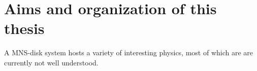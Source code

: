 %
%
%
%
%
%

\section{Aims and organization of this thesis}

A \pmerg{} \ac{MNS}-disk system hosts a variety of interesting physics, most of which are 
are currently not well understood.
